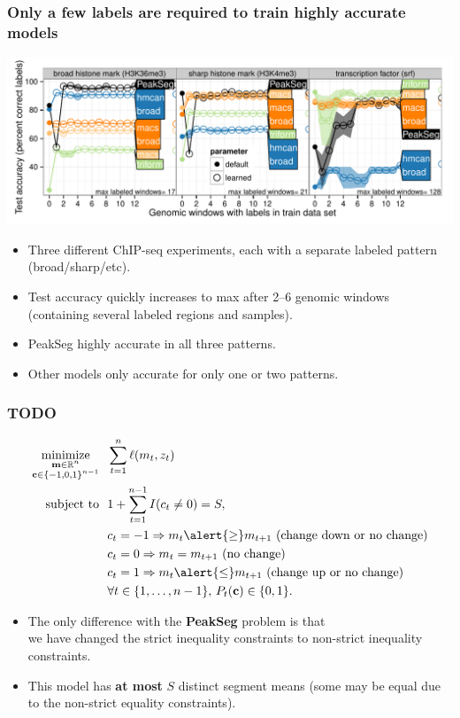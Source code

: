 \documentclass{beamer}
\DeclareMathOperator*{\minimize}{minimize}
\newcommand{\RR}{\mathbb R}
\begin{document}
\begin{frame}
  \frametitle{Only a few labels are required to train highly accurate models}
  \includegraphics[width=1.1\textwidth]{figure-test-error-decreases-mean.pdf}

  \begin{itemize}
  \item Three different ChIP-seq experiments, each with a separate
    labeled pattern (broad/sharp/etc).
  \item Test accuracy quickly increases to max after 2--6
    genomic windows (containing several labeled regions and samples).
  \item PeakSeg highly accurate in all three patterns.
  \item Other models only accurate for only one or two patterns.
  \end{itemize}
\end{frame}

\begin{frame}
  \frametitle{TODO}
\begin{align*}
    \minimize_{\substack{
  \mathbf m\in\RR^{n}
\\
  \mathbf c\in\{-1,0,1\}^{n-1}
  }} &\ \ 
    \sum_{t=1}^n \ell( m_t,  z_t) 
  \label{PeakSegPDPA}
\\
    \text{subject to} &\ \  1+ \sum_{t=1}^{n-1} I(c_t \neq 0) = S, 
\nonumber\\
& \ \ c_t = -1 \Rightarrow m_{t} \alert{\geq} m_{t+1} \text{ (change down or no change)}
\nonumber\\
& \ \ c_t = 0 \Rightarrow m_{t} = m_{t+1}  \text{ (no change)}
\nonumber\\
& \ \ c_t = 1 \Rightarrow m_{t} \alert{\leq} m_{t+1} \text{ (change up or no change)}
\nonumber\\
&\ \ \forall t\in\{1, \dots, n-1\},\, P_t(\mathbf c) \in\{0, 1\}.
\nonumber
\end{align*}
\begin{itemize}
\item The only difference with the \textbf{PeakSeg} problem is that\\
  \alert{we have changed the strict inequality constraints to non-strict inequality
constraints}. 
\item This model has \textbf{at most} $S$ distinct
  segment means (some may be equal due to the non-strict equality
  constraints).
\end{itemize}
\end{frame}
\end{document}

